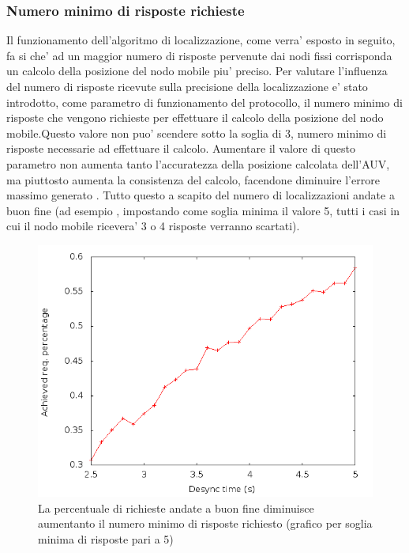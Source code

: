 \subsubsection{Numero minimo di risposte richieste}
Il funzionamento dell'algoritmo di localizzazione, come verra' esposto in seguito, fa si che' ad un maggior numero di risposte pervenute dai nodi fissi corrisponda un calcolo della posizione del nodo mobile piu' preciso.
Per valutare l'influenza del numero di risposte ricevute sulla precisione della localizzazione e' stato introdotto, come parametro di funzionamento del protocollo, il numero minimo di risposte che vengono richieste per effettuare il calcolo della posizione del nodo mobile.\newline Questo valore non puo' scendere sotto la soglia di 3, numero minimo di risposte necessarie ad effettuare il calcolo. 
Aumentare il valore di questo parametro non aumenta tanto l'accuratezza della posizione calcolata dell'AUV, ma piuttosto aumenta la consistenza del calcolo, facendone diminuire l'errore massimo generato . Tutto questo a scapito  del numero di localizzazioni andate a buon fine (ad esempio , impostando come soglia minima il valore 5, tutti i casi in cui il nodo mobile ricevera' 3 o 4  risposte verranno scartati).\newline
\begin{figure}[H]
    \centering
    \includegraphics[scale=0.5]{achievedlochexagon6nodescutoff4req5preempt0droponepoint0speed1.png}
    \caption{La percentuale di richieste andate a buon fine diminuisce aumentanto il numero minimo di risposte richiesto (grafico per soglia minima di risposte pari a 5)}
\end{figure}

